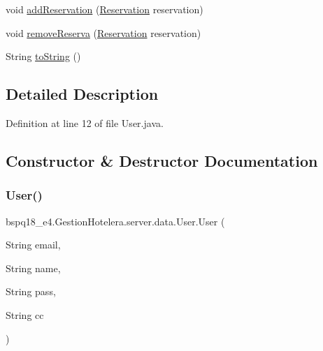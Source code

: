 \begin{DoxyCompactItemize}
\item 
void \mbox{\hyperlink{classbspq18__e4_1_1_gestion_hotelera_1_1server_1_1data_1_1_user_abaeeb2620597f07c763abda51e1b1617}{add\+Reservation}} (\mbox{\hyperlink{classbspq18__e4_1_1_gestion_hotelera_1_1server_1_1data_1_1_reservation}{Reservation}} reservation)
\item 
void \mbox{\hyperlink{classbspq18__e4_1_1_gestion_hotelera_1_1server_1_1data_1_1_user_a896e888a97f18b08ff6e8b7b0da7b15e}{remove\+Reserva}} (\mbox{\hyperlink{classbspq18__e4_1_1_gestion_hotelera_1_1server_1_1data_1_1_reservation}{Reservation}} reservation)
\item 
String \mbox{\hyperlink{classbspq18__e4_1_1_gestion_hotelera_1_1server_1_1data_1_1_user_adb8b16c2135d62e11a93ef4f77190181}{to\+String}} ()
\end{DoxyCompactItemize}


\subsection{Detailed Description}


Definition at line 12 of file User.\+java.



\subsection{Constructor \& Destructor Documentation}
\mbox{\label{classbspq18__e4_1_1_gestion_hotelera_1_1server_1_1data_1_1_user_ac6613f3cb753c9f9eb166b933a0376fc}} 
\subsubsection{\texorpdfstring{User()}{User()}}
{\footnotesize\ttfamily bspq18\+\_\+e4.\+Gestion\+Hotelera.\+server.\+data.\+User.\+User (\begin{DoxyParamCaption}\item[{String}]{email,  }\item[{String}]{name,  }\item[{String}]{pass,  }\item[{String}]{cc }\end{DoxyParamCaption})}



